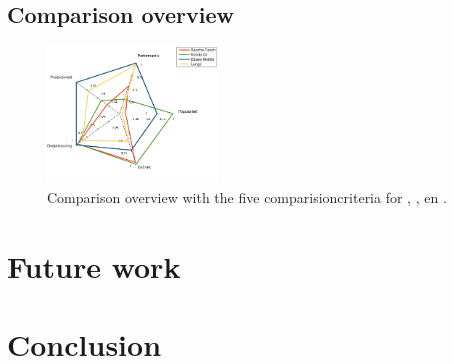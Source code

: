 \documentclass[a4paper]{artikel3}
\begin{document}

\subsection{Comparison overview} %
\label{sec:evaluation-overview}

\begin{figure}
  \centering
  \includegraphics[width=0.4\textwidth]{../Masterproef/figuren/spidergraph-final.pdf}
  \caption{Comparison overview with the five comparisioncriteria for \st{},  \kendo{},  \jqm{} en \lungo{}.}
  \label{fig:spidergraph}
\end{figure}



\section{Future work} %
\label{sec:future_work}



\section{Conclusion} %
\label{sec:conclusion}




%


\end{document}
